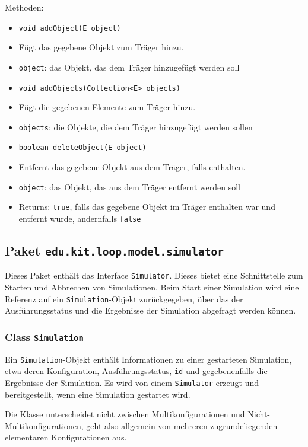 \documentclass[parskip=full,11pt]{scrartcl}
\begin{document}
Methoden:
\begin{itemize}\itemsep -10pt
\item \texttt{void addObject(E object)}
\item[] Fügt das gegebene Objekt zum Träger hinzu.
\item[] \texttt{object}: das Objekt, das dem Träger hinzugefügt werden soll

\item \texttt{void addObjects(Collection<E> objects)}
\item[] Fügt die gegebenen Elemente zum Träger hinzu.
\item[] \texttt{objects}: die Objekte, die dem Träger hinzugefügt werden sollen

\item \texttt{boolean deleteObject(E object)}
\item[] Entfernt das gegebene Objekt aus dem Träger, falls enthalten.
\item[] \texttt{object}: das Objekt, das aus dem Träger entfernt werden soll
\item[] Returns: \texttt{true}, falls das gegebene Objekt im Träger enthalten war und entfernt wurde, andernfalls \texttt{false}
\end{itemize}

\subsection{Paket \texttt{edu.kit.loop.model.simulator}}
Dieses Paket enthält das Interface \texttt{Simulator}. Dieses bietet eine Schnittstelle zum Starten und Abbrechen von Simulationen. Beim Start einer Simulation wird eine Referenz auf ein \texttt{Simulation}-Objekt zurückgegeben, über das der Ausführungsstatus und die Ergebnisse der Simulation abgefragt werden können.

\subsubsection{Class \texttt{Simulation}}
Ein \texttt{Simulation}-Objekt enthält Informationen zu einer gestarteten Simulation, etwa deren Konfiguration, Ausführungsstatus, \texttt{id} und gegebenenfalls die Ergebnisse der Simulation. Es wird von einem \texttt{Simulator} erzeugt und bereitgestellt, wenn eine Simulation gestartet wird.

Die Klasse unterscheidet nicht zwischen Multikonfigurationen und Nicht-Multikonfigurationen, geht also allgemein von mehreren zugrundeliegenden elementaren Konfigurationen aus.
\end{document}
